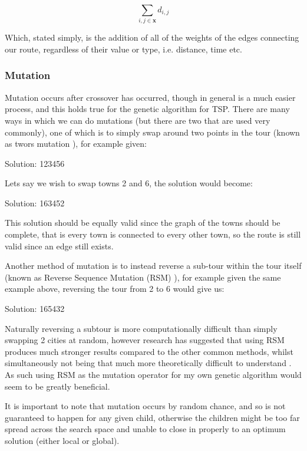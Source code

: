 \documentclass[11pt,a4paper,titlepage]{article}
\begin{document}
\[\sum_{i,j \in \mathbf{x}} d_{i,j}\]

Which, stated simply, is the addition of all of the weights of the edges connecting our route, regardless of their value or type, i.e. distance, time etc.

\subsubsection{Mutation}

Mutation occurs after crossover has occurred, though in general is a much easier process, and this holds true for the genetic algorithm for TSP. There are many ways in which we can do mutations (but there are two that are used very commonly), one of which is to simply swap around two points in the tour (known as twors mutation \cite{GAMutations}), for example given:

\begin{center}\Large
Solution: 123456
\end{center}

Lets say we wish to swap towns 2 and 6, the solution would become:

\begin{center}\Large
Solution: 163452
\end{center}

This solution should be equally valid since the graph of the towns should be complete, that is every town is connected to every other town, so the route is still valid since an edge still exists.

Another method of mutation is to instead reverse a sub-tour within the tour itself (known as Reverse Sequence Mutation (RSM) \cite{GAMutations}), for example given the same example above, reversing the tour from 2 to 6 would give us:
 
\begin{center}\Large
Solution: 165432
\end{center}

Naturally reversing a subtour is more computationally difficult than simply swapping 2 cities at random, however research has suggested that using RSM produces much stronger results compared to the other common methods, whilst simultaneously not being that much more theoretically difficult to understand \cite{GAMutations}. As such using RSM as the mutation operator for my own genetic algorithm would seem to be greatly beneficial.

It is important to note that mutation occurs by random chance, and so is not guaranteed to happen for any given child, otherwise the children might be too far spread across the search space and unable to close in properly to an optimum solution (either local or global).
\end{document}
